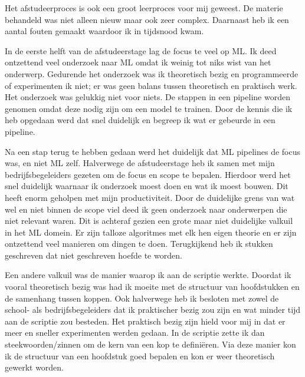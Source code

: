 Het afstudeerproces is ook een groot leerproces voor mij geweest. De materie behandeld was niet alleen nieuw maar ook zeer complex. Daarnaast heb ik een aantal fouten gemaakt waardoor ik in tijdsnood kwam.

In de eerste helft van de afstudeerstage lag de focus te veel op ML. Ik deed ontzettend veel onderzoek naar ML omdat ik weinig tot niks wist van het onderwerp. Gedurende het onderzoek was ik theoretisch bezig en programmeerde of experimenten ik niet; er was geen balans tussen theoretisch en praktisch werk. Het onderzoek was gelukkig niet voor niets. De stappen in een pipeline worden genomen omdat deze nodig zijn om een model te trainen. Door de kennis die ik heb opgedaan werd dat snel duidelijk en begreep ik wat er gebeurde in een pipeline.

Na een stap terug te hebben gedaan werd het duidelijk dat ML pipelines de focus was, en niet ML zelf. Halverwege de afstudeerstage heb ik samen met mijn bedrijfsbegeleiders gezeten om de focus en scope te bepalen. Hierdoor werd het snel duidelijk waarnaar ik onderzoek moest doen en wat ik moest bouwen. Dit heeft enorm geholpen met mijn productiviteit. Door de duidelijke grens van wat wel en niet binnen de scope viel deed ik geen onderzoek naar onderwerpen die niet relevant waren. Dit is achteraf gezien een grote maar niet duidelijke valkuil in het ML domein. Er zijn talloze algoritmes met elk hen eigen theorie en er zijn ontzettend veel manieren om dingen te doen. Terugkijkend heb ik stukken geschreven dat niet geschreven hoefde te worden.

Een andere valkuil was de manier waarop ik aan de scriptie werkte. Doordat ik vooral theoretisch bezig was had ik moeite met de structuur van hoofdstukken en de samenhang tussen koppen. Ook halverwege heb ik besloten met zowel de school- als bedrijfsbegeleiders dat ik praktischer bezig zou zijn en wat minder tijd aan de scriptie zou besteden. Het praktisch bezig zijn hield voor mij in dat er meer en sneller experimenten werden gedaan. In de scriptie zette ik dan steekwoorden/zinnen om de kern van een kop te definiëren. Via deze manier kon ik de structuur van een hoofdstuk goed bepalen en kon er weer theoretisch gewerkt worden.

